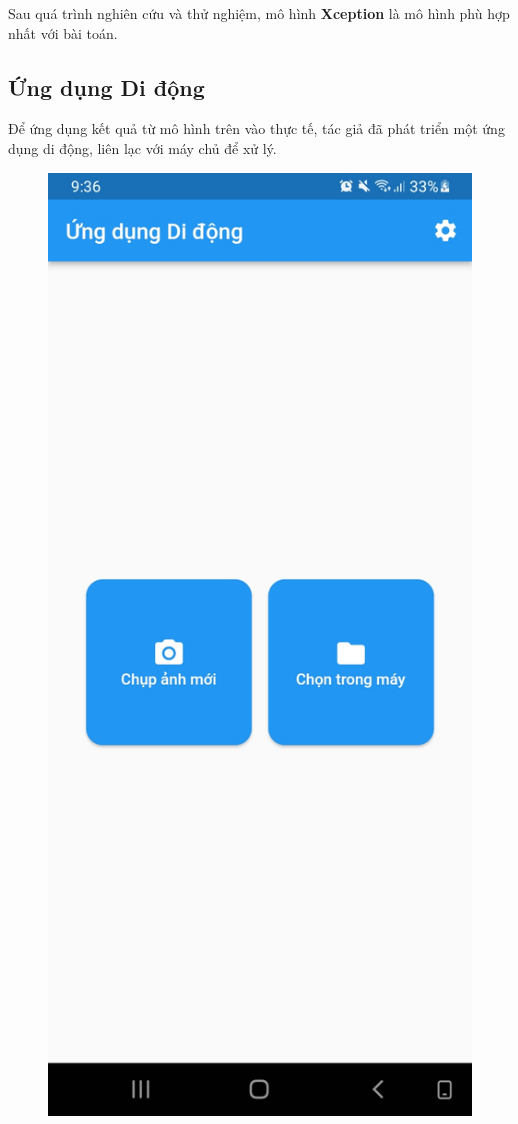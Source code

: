 \documentclass[a4paper,14pt]{extarticle}
\begin{document}
		Sau quá trình nghiên cứu và thử nghiệm, mô hình \textbf{Xception} là mô hình phù hợp nhất với bài toán.

	\subsection{Ứng dụng Di động}
	Để ứng dụng kết quả từ mô hình trên vào thực tế, tác giả đã phát triển một ứng dụng di động, liên lạc với máy chủ để xử lý.

	\begin{figure}[H]
		\centering
		\includegraphics[scale=0.1]{images/screenshot1.jpg}

\end{figure}
\end{document}

